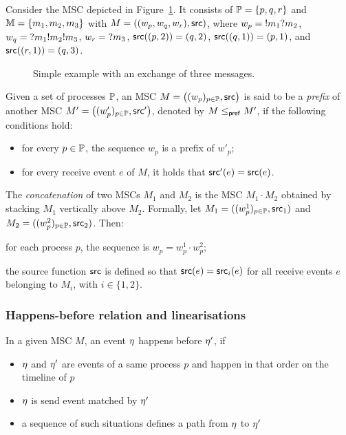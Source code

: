 \begin{example}\label{exmp:msc}
Consider the MSC depicted in Figure~\ref{fig:msc-exmp}.  
It consists of $\mathbb{P}=\{p,q,r\}$ and $\mathbb{M}=\{m_1,m_2,m_3\}$
with $M=((w_p,w_q,w_r),\mathsf{src})$, where
$w_p = {}!m_1{}?m_2$, 
$w_q = {}?m_1{}!m_2{}!m_3$, 
$w_r = {}?m_3$,
$\mathsf{src}((p,2)) = (q,2)$,
$\mathsf{src}((q,1)) = (p,1)$, and
$\mathsf{src}((r,1)) = (q,3)$.

\begin{figure}[!ht]
\centering
\begin{msc}[draw frame=none, draw head=none, msc keyword=, head height=0px, label distance=0.5ex, foot height=0px, foot distance=0px]{}

	\nextlevel
	\nextlevel
\end{msc}
\caption{Simple example with an exchange of three messages.}
\label{fig:msc-exmp}
\end{figure}
\end{example}

Given a set of processes $\mathbb{P}$, an MSC 
$M=\big((w_p)_{p\in\mathbb{P}},\mathsf{src}\big)$ is said to be a 
\emph{prefix} of another MSC 
$M'=\big((w'_p)_{p\in\mathbb{P}},\mathsf{src}'\big)$, denoted by 
$M \mathrel{\leq_{\mathsf{pref}}} M'$, if the following conditions hold:  
\begin{itemize}
    \item for every $p \in \mathbb{P}$, the sequence $w_p$ is a prefix 
    of $w'_p$;  
    \item for every receive event $e$ of $M$, it holds that 
    $\mathsf{src}'(e)=\mathsf{src}(e)$.  
\end{itemize}

The \emph{concatenation} of two MSCs $M_1$ and $M_2$ is the MSC 
$M_1 \cdot M_2$ obtained by stacking $M_1$ vertically above $M_2$. 
Formally, let 
$M_1=((w_p^1)_{p\in\mathbb{P}},\mathsf{src}_1)$ and 
$M_2=((w_p^2)_{p\in\mathbb{P}},\mathsf{src}_2)$. Then:  
\begin{inparaenum}[(i)]
   \item for each process $p$, the sequence is 
   $w_p = w_p^1 \cdot w_p^2$;  
   \item the source function $\mathsf{src}$ is defined so that 
   $\mathsf{src}(e)=\mathsf{src}_i(e)$ for all receive events $e$ belonging 
   to $M_i$, with $i\in\{1,2\}$.  
\end{inparaenum}


\subsubsection*{Happens-before relation and linearisations}
In a given MSC $M$, an event $\eta$ happens before $\eta'$, if 
 \begin{itemize}
	\item $\eta$ and $\eta'$ are events
	of a same process $p$ and happen in that order on 
	the timeline of $p$
	\item  $\eta$ is send event matched by $\eta'$
	\item a sequence of such situations defines
	a path from $\eta$ to $\eta'$
\end{itemize}

